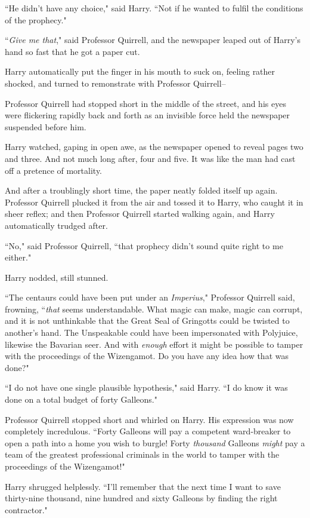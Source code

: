 ``He didn't have any choice," said Harry. ``Not if he wanted to fulfil the conditions of the prophecy."

``\emph{Give me that}," said Professor Quirrell, and the newspaper leaped out of Harry's hand so fast that he got a paper cut.

Harry automatically put the finger in his mouth to suck on, feeling rather shocked, and turned to remonstrate with Professor Quirrell\---

Professor Quirrell had stopped short in the middle of the street, and his eyes were flickering rapidly back and forth as an invisible force held the newspaper suspended before him.

Harry watched, gaping in open awe, as the newspaper opened to reveal pages two and three. And not much long after, four and five. It was like the man had cast off a pretence of mortality.

And after a troublingly short time, the paper neatly folded itself up again. Professor Quirrell plucked it from the air and tossed it to Harry, who caught it in sheer reflex; and then Professor Quirrell started walking again, and Harry automatically trudged after.

``No," said Professor Quirrell, ``that prophecy didn't sound quite right to me either."

Harry nodded, still stunned.

``The centaurs could have been put under an \emph{Imperius}," Professor Quirrell said, frowning, ``\emph{that} seems understandable. What magic can make, magic can corrupt, and it is not unthinkable that the Great Seal of Gringotts could be twisted to another's hand. The Unspeakable could have been impersonated with Polyjuice, likewise the Bavarian seer. And with \emph{enough} effort it might be possible to tamper with the proceedings of the Wizengamot. Do you have any idea how that was done?"

``I do not have one single plausible hypothesis," said Harry. ``I do know it was done on a total budget of forty Galleons."

Professor Quirrell stopped short and whirled on Harry. His expression was now completely incredulous. ``Forty Galleons will pay a competent ward-breaker to open a path into a home you wish to burgle! Forty \emph{thousand} Galleons \emph{might} pay a team of the greatest professional criminals in the world to tamper with the proceedings of the Wizengamot!"

Harry shrugged helplessly. ``I'll remember that the next time I want to save thirty-nine thousand, nine hundred and sixty Galleons by finding the right contractor."

